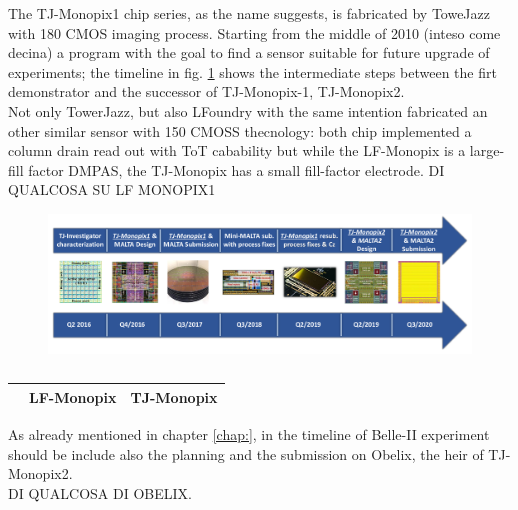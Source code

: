 
The TJ-Monopix1 chip series, as the name suggests, is fabricated by ToweJazz with 180 CMOS imaging process. Starting from the middle of 2010 (inteso come decina) a program with the goal to find a sensor suitable for future upgrade of experiments; the timeline in fig. \ref{fig:TJ180nm} shows the intermediate steps between the firt demonstrator and the successor of TJ-Monopix-1, TJ-Monopix2.\\
Not only TowerJazz, but also LFoundry with the same intention fabricated an other similar sensor with 150 CMOSS thecnology: both chip implemented a column drain read out with ToT cabability but while the LF-Monopix is a large-fill factor DMPAS, the TJ-Monopix has a small fill-factor electrode. DI QUALCOSA SU LF MONOPIX1
\begin{figure}[h!]
    \centering
    \includegraphics[width=.9\linewidth]{figures/Monopix1/TJ180nm.png}
    \caption{}
    \label{fig:TJ180nm}
\end{figure} 

\begin{table}
    \begin{center}
    \begin{tabular}{|c | c |c |}
    \hline
    & LF-Monopix & TJ-Monopix\\
    \hline
    \hline

    \hline
    \end{tabular}
    \caption{}
    \label{tab:LF-TJ-Monopix}
    \end{center}
 \end{table}

As already mentioned in chapter \ref{chap:}, in the timeline of Belle-II experiment should be include also the planning and the submission on Obelix, the heir of TJ-Monopix2. \\
DI QUALCOSA DI OBELIX.\\


